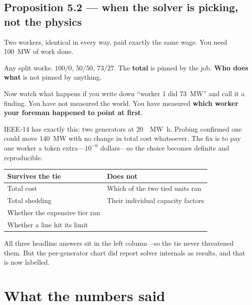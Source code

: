 \documentclass[11pt,a4paper]{article}
\begin{document}
\subsection{Proposition 5.2 --- when the solver is picking, not the physics}

\begin{anchor}
Two workers, identical in every way, paid exactly the same wage. You need
\SI{100}{\mega\watt} of work done.

Any split works: $100/0$, $50/50$, $73/27$. The \textbf{total} is pinned by the
job. \textbf{Who does what} is not pinned by anything.

Now watch what happens if you write down ``worker 1 did \SI{73}{\mega\watt}'' and
call it a finding. You have not measured the world. You have measured
\textbf{which worker your foreman happened to point at first}.
\end{anchor}

IEEE-14 has exactly this: two generators at \SI{20}{\per\mega\watt\hour}. Probing
confirmed one could move \SI{140}{\mega\watt} with no change in total cost
whatsoever. The fix is to pay one worker a token extra---$10^{-6}$ dollars---so
the choice becomes definite and reproducible.

\begin{center}
\small
\begin{tabular}{@{}lp{}@{}}
\toprule
\textbf{Survives the tie} & \textbf{Does not} \\
\midrule
Total cost & Which of the two tied units ran \\
Total shedding & Their individual capacity factors \\
Whether the expensive tier ran & \\
Whether a line hit its limit & \\
\bottomrule
\end{tabular}
\end{center}

All three headline answers sit in the left column---so the tie never threatened
them. But the per-generator chart did report solver internals as results, and
that is now labelled.

\section{What the numbers said}
\end{document}
